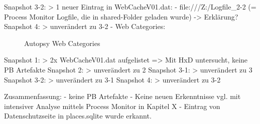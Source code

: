 	Snapshot 3-2:
		> 1 neuer Eintrag in WebCacheV01.dat:
			- file:///Z:/Logfile\_2-2 (= Process Monitor Logfile, die in shared-Folder geladen wurde) -> Erklärung?
	Snapshot 4:
		> unverändert zu 3-2
- Web Categories:
	\begin{figure}[h!]
		\centerline{}
		\label{chart:final-criteria}  
		\caption{Autopsy Web Categories}
	\end{figure}
	Snapshot 1:
		> 2x WebCacheV01.dat aufgelistet => Mit HxD untersucht, keine PB Artefakte
	Snapshot 2:
		> unverändert zu 2
	Snapshot 3-1:
		> unverändert zu 3
	Snapshot 3-2:
		> unverändert zu 3-1
	Snapshot 4:
		> unverändert zu 3-2
		
Zusammenfassung:
- keine PB Artefakte
- Keine neuen Erkenntnisse vgl. mit intensiver Analyse mittels Process Monitor in Kapitel X
- Eintrag von Datenschutzseite in places.sqlite wurde erkannt.


